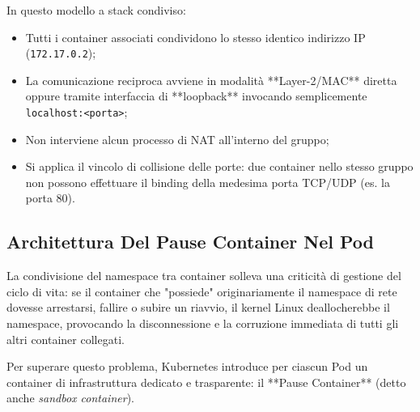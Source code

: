 \documentclass[11pt, a4paper]{article}
\begin{document}

In questo modello a stack condiviso:
\begin{itemize}[noitemsep]
    \item Tutti i container associati condividono lo stesso identico indirizzo IP (\texttt{172.17.0.2});
    \item La comunicazione reciproca avviene in modalità **Layer-2/MAC** diretta oppure tramite interfaccia di **loopback** invocando semplicemente \texttt{localhost:<porta>};
    \item Non interviene alcun processo di NAT all'interno del gruppo;
    \item Si applica il vincolo di collisione delle porte: due container nello stesso gruppo non possono effettuare il binding della medesima porta TCP/UDP (es. la porta 80).
\end{itemize}

\subsection{Architettura Del Pause Container Nel Pod}

La condivisione del namespace tra container solleva una criticità di gestione del ciclo di vita: se il container che "possiede" originariamente il namespace di rete dovesse arrestarsi, fallire o subire un riavvio, il kernel Linux deallocherebbe il namespace, provocando la disconnessione e la corruzione immediata di tutti gli altri container collegati.

Per superare questo problema, Kubernetes introduce per ciascun Pod un container di infrastruttura dedicato e trasparente: il **Pause Container** (detto anche \emph{sandbox container}).

\end{document}
